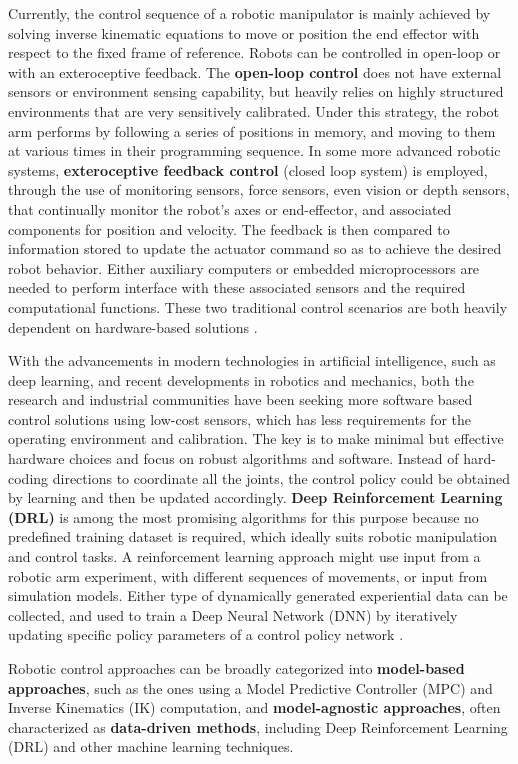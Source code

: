 Currently, the control sequence of a robotic manipulator is mainly achieved by solving
inverse kinematic equations to move or position the end effector with respect to the
fixed frame of reference. Robots can be controlled in open-loop or with
an exteroceptive feedback. The \textbf{open-loop control} does not have external sensors or
environment sensing capability, but heavily relies on highly structured environments
that are very sensitively calibrated. Under this strategy, the robot arm performs by
following a series of positions in memory, and moving to them at various times in their
programming sequence. In some more advanced robotic systems, \textbf{exteroceptive feedback
	control} (closed loop system) is employed, through the use of monitoring sensors, force sensors,
even vision or depth sensors, that continually monitor the robot's axes or end-effector, and
associated components for position and velocity. The feedback is then compared to information
stored to update the actuator command so as to achieve the desired robot behavior. Either
auxiliary computers or embedded microprocessors are needed to perform interface with
these associated sensors and the required computational functions. These two traditional
control scenarios are both heavily dependent on hardware-based solutions \cite{liu2021deep}.

With the advancements in modern technologies in artificial intelligence, such as
deep learning, and recent developments in robotics and mechanics, both the research
and industrial communities have been seeking more software based control solutions
using low-cost sensors, which has less requirements for the operating environment and
calibration. The key is to make minimal but effective hardware choices and focus on robust
algorithms and software. Instead of hard-coding directions to coordinate all the joints,
the control policy could be obtained by learning and then be updated accordingly. \textbf{Deep
	Reinforcement Learning (DRL)} is among the most promising algorithms for this purpose
because no predefined training dataset is required, which ideally suits robotic manipulation
and control tasks. A reinforcement learning approach might use
input from a robotic arm experiment, with different sequences of movements, or input
from simulation models. Either type of dynamically generated experiential data can be
collected, and used to train a Deep Neural Network (DNN) by iteratively updating specific
policy parameters of a control policy network \cite{liu2021deep}.

Robotic control approaches can be broadly categorized into \textbf{model-based approaches}, such as
the ones using a Model Predictive Controller (MPC) and Inverse Kinematics (IK) computation,
and \textbf{model-agnostic approaches}, often characterized as \textbf{data-driven methods},
including Deep Reinforcement Learning (DRL) and other machine learning techniques.

